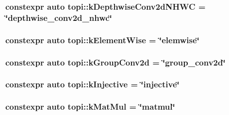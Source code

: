 \subsubsection[{\texorpdfstring{k\+Depthwise\+Conv2d\+N\+H\+WC}{kDepthwiseConv2dNHWC}}]{\setlength{\rightskip}{0pt plus 5cm}constexpr auto topi\+::k\+Depthwise\+Conv2d\+N\+H\+WC = \char`\"{}depthwise\+\_\+conv2d\+\_\+nhwc\char`\"{}}\hypertarget{namespacetopi_a00fa259c7a4c72504f9ac906062e9ebc}{}\label{namespacetopi_a00fa259c7a4c72504f9ac906062e9ebc}
\subsubsection[{\texorpdfstring{k\+Element\+Wise}{kElementWise}}]{\setlength{\rightskip}{0pt plus 5cm}constexpr auto topi\+::k\+Element\+Wise = \char`\"{}elemwise\char`\"{}}\hypertarget{namespacetopi_ac1b34ed59d38a5f5338bee6b2cad42be}{}\label{namespacetopi_ac1b34ed59d38a5f5338bee6b2cad42be}
\subsubsection[{\texorpdfstring{k\+Group\+Conv2d}{kGroupConv2d}}]{\setlength{\rightskip}{0pt plus 5cm}constexpr auto topi\+::k\+Group\+Conv2d = \char`\"{}group\+\_\+conv2d\char`\"{}}\hypertarget{namespacetopi_a4147e63b5ce67e3340ed5096bf6b9455}{}\label{namespacetopi_a4147e63b5ce67e3340ed5096bf6b9455}
\subsubsection[{\texorpdfstring{k\+Injective}{kInjective}}]{\setlength{\rightskip}{0pt plus 5cm}constexpr auto topi\+::k\+Injective = \char`\"{}injective\char`\"{}}\hypertarget{namespacetopi_a60f05ec416e4618d25ad00dd9f536934}{}\label{namespacetopi_a60f05ec416e4618d25ad00dd9f536934}
\subsubsection[{\texorpdfstring{k\+Mat\+Mul}{kMatMul}}]{\setlength{\rightskip}{0pt plus 5cm}constexpr auto topi\+::k\+Mat\+Mul = \char`\"{}matmul\char`\"{}}\hypertarget{namespacetopi_a06a6892f5e4681142f0c08b0af32499d}{}\label{namespacetopi_a06a6892f5e4681142f0c08b0af32499d}
